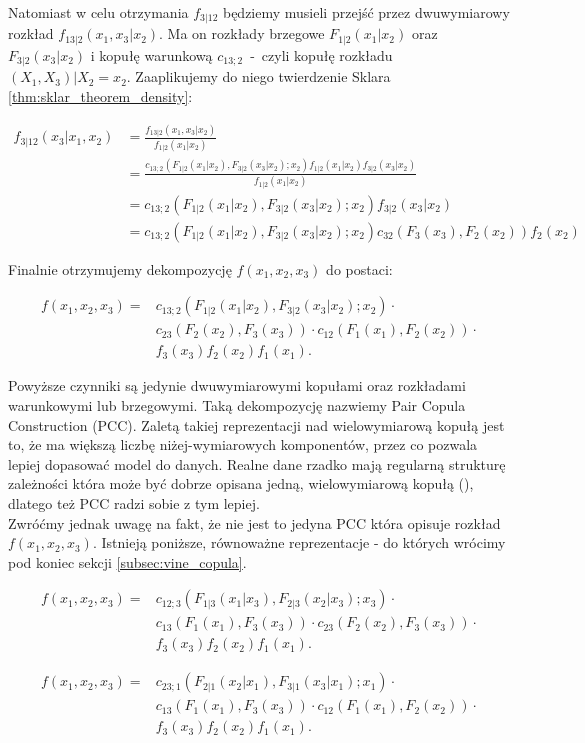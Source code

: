 Natomiast w celu otrzymania $f_{3|12}$ będziemy musieli przejść przez dwuwymiarowy rozkład $f_{13|2}(x_1, x_3|x_2)$. Ma on rozkłady brzegowe $F_{1|2}(x_1|x_2)$ oraz $F_{3|2}(x_3|x_2)$ i kopułę warunkową $c_{13;2}$~-~czyli kopułę rozkładu $(X_1, X_3) | X_2=x_2$. Zaaplikujemy do niego twierdzenie Sklara \ref{thm:sklar_theorem_density}:

\begin{equation*}
	\begin{split}
		f_{3|12}(x_3|x_1,x_2)  & = \frac{f_{13|2}(x_1, x_3|x_2)}{f_{1|2}(x_1|x_2)} \\
		& = \frac{c_{13;2}(F_{1|2}(x_1|x_2), F_{3|2}(x_3|x_2); x_2)f_{1|2}(x_1|x_2)f_{3|2}(x_3|x_2)}{f_{1|2}(x_1|x_2)}\\
		& = c_{13;2}(F_{1|2}(x_1|x_2), F_{3|2}(x_3|x_2); x_2)f_{3|2}(x_3|x_2) \\
		& = c_{13;2}(F_{1|2}(x_1|x_2), F_{3|2}(x_3|x_2); x_2)c_{32}(F_3(x_3), F_2(x_2))f_2(x_2)
	\end{split}
\end{equation*}

Finalnie otrzymujemy dekompozycję $f(x_1, x_2, x_3)$ do postaci:

\begin{equation}
	\begin{split}
	f(x_1, x_2, x_3) = &c_{13;2}(F_{1|2}(x_1|x_2), F_{3|2}(x_3|x_2); x_2) \cdot \\
	& c_{23}(F_2(x_2), F_3(x_3)) \cdot c_{12}(F_1(x_1), F_2(x_2)) \cdot \\
	& f_3(x_3)f_2(x_2)f_1(x_1).
	\end{split}
	\label{eq:PCC}
\end{equation}

Powyższe czynniki są jedynie dwuwymiarowymi kopułami oraz rozkładami warunkowymi lub brzegowymi. Taką dekompozycję nazwiemy Pair Copula Construction (PCC). Zaletą takiej reprezentacji nad wielowymiarową kopułą jest to, że ma większą liczbę niżej-wymiarowych komponentów, przez co pozwala lepiej dopasować model do danych. Realne dane rzadko mają regularną strukturę zależności która może być dobrze opisana jedną, wielowymiarową kopułą (\cite{Czado_Vine_Copulas}), dlatego też PCC radzi sobie z tym lepiej.\\
Zwróćmy jednak uwagę na fakt, że nie jest to jedyna PCC która opisuje rozkład $f(x_1, x_2, x_3)$. Istnieją poniższe, równoważne reprezentacje - do których wrócimy pod koniec sekcji \ref{subsec:vine_copula}.

\begin{equation}
	\begin{split}
		f(x_1, x_2, x_3) = &c_{12;3}(F_{1|3}(x_1|x_3), F_{2|3}(x_2|x_3); x_3) \cdot \\
		& c_{13}(F_1(x_1), F_3(x_3)) \cdot c_{23}(F_2(x_2), F_3(x_3)) \cdot \\
		& f_3(x_3)f_2(x_2)f_1(x_1).
	\end{split}
\end{equation}

\begin{equation*}
	\begin{split}
		f(x_1, x_2, x_3) = &c_{23;1}(F_{2|1}(x_2|x_1), F_{3|1}(x_3|x_1); x_1) \cdot \\
		& c_{13}(F_1(x_1), F_3(x_3)) \cdot c_{12}(F_1(x_1), F_2(x_2)) \cdot \\
		& f_3(x_3)f_2(x_2)f_1(x_1).
	\end{split}
\end{equation*}